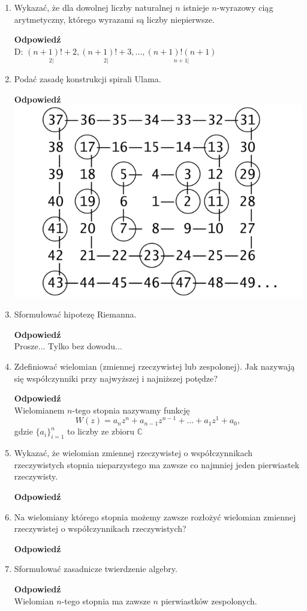 \documentclass[12pt,a4paper]{article}
\newcounter{twierdzenie}
\theoremstyle{break}
\newcommand{\Odp}[1]{
		\begin{mdframed}[style=zadanie]
			\textbf{Odpowiedź}\\
			#1
		\end{mdframed}
	}
\begin{document}
\begin{enumerate}[1.]
{		Hp. $\exists_r : r$ - różnica tego ciągu i wszystkie jego wyrazy to liczby pierwsze.
		
		$p,p+r,p+2r,\dots,p+pr = p(1+r) \Rightarrow p|p(1+r)$ Sprzeczność 
	}
	
	\item Wykazać, że dla dowolnej liczby naturalnej $n$ istnieje $n$-wyrazowy ciąg arytmetyczny,
	którego wyrazami są liczby niepierwsze.
	\Odp{
		D: $\underset{2|}{(n+1)!+2},\underset{2|}{(n+1)!+3},\dots,\underset{n+1|}{(n+1)!(n+1)}$
	}
	
	\item Podać zasadę konstrukcji spirali Ulama.
	\Odp{
		
		\centering
		\includegraphics[width = 0.75\linewidth]{Ulam_Spiral.png}
	}
	
	\item Sformułować hipotezę Riemanna.
	\Odp{
		Prosze... Tylko bez dowodu...
	}
	
	\item Zdeﬁniować wielomian (zmiennej rzeczywistej lub zespolonej). Jak nazywają się współczynniki przy najwyższej i najniższej potędze?
	\Odp{
		Wielomianem $n$-tego stopnia nazywamy funkcję
		$$W(z)=a_nz^n+a_{n-1}z^{n-1}+\dots+a_1z^1+a_0,$$
		gdzie $\{a_i\}_{i=1}^n$ to liczby ze zbioru $\mathbb{C}$
	}
	
	\item Wykazać, że wielomian zmiennej rzeczywistej o współczynnikach rzeczywistych stopnia nieparzystego ma zawsze co najmniej jeden pierwiastek rzeczywisty.
	\Odp{
		
	}
	
	\item Na wielomiany którego stopnia możemy zawsze rozłożyć wielomian zmiennej rzeczywistej o współczynnikach rzeczywistych?
	\Odp{
		
	}
	
	\item Sformułować zasadnicze twierdzenie algebry.
	\Odp{
		Wielomian $n$-tego stopnia ma zawsze $n$ pierwiastków zespolonych.
	}
	

\end{enumerate}
\end{document}
